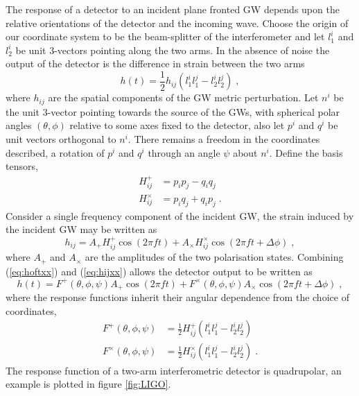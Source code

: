 The response of a detector to an incident plane fronted GW depends upon the relative orientations of the detector and the incoming wave. Choose the origin of our coordinate system to be the beam-splitter of the interferometer and let $l_{1}^{i}$ and $l_{2}^{i}$ be unit 3-vectors pointing along the two arms. In the absence of noise the output of the detector is the difference in strain between the two arms \citep{MTW}
\begin{equation}\label{eq:hoftxx} h(t)=\frac{1}{2}h_{ij}\left( l_{1}^{i}l_{1}^{j}-l_{2}^{i}l_{2}^{j} \right)\; , \end{equation}
where $h_{ij}$ are the spatial components of the GW metric perturbation. Let $n^{i}$ be the unit 3-vector pointing towards the source of the GWs, with spherical polar angles $(\theta,\phi)$ relative to some axes fixed to the detector, also let $p^{i}$ and $q^{i}$ be unit vectors orthogonal to $n^{i}$. There remains a freedom in the coordinates described, a rotation of $p^{i}$ and $q^{i}$ through an angle $\psi$ about $n^{i}$. Define the basis tensors,
\begin{eqnarray}
H^{+}_{ij}&=p_{i}p_{j}-q_{i}q_{j} \nonumber \\
H^{\times}_{ij}&=p_{i}q_{j}+q_{i}p_{j} \; .
\end{eqnarray}
Consider a single frequency component of the incident GW, the strain induced by the incident GW may be written as
\begin{equation}\label{eq:hijxx} h_{ij}=A_{+}H^{+}_{ij}\cos\left(2\pi ft\right)+A_{\times}H^{\times}_{ij}\cos\left(2\pi ft+\Delta \phi\right) \; ,\end{equation}
where $A_{+}$ and $A_{\times}$ are the amplitudes of the two polarisation states. Combining (\ref{eq:hoftxx}) and (\ref{eq:hijxx}) allows the detector output to be written as
\begin{equation} h(t)=F^{+}(\theta,\phi,\psi)A_{+}\cos\left(2\pi ft\right)+F^{\times}(\theta,\phi,\psi)A_{\times}\cos\left(2\pi f t + \Delta\phi \right)\; , \end{equation}
where the response functions inherit their angular dependence from the choice of coordinates,
\begin{eqnarray}\label{eq:responsefuncs}
F^{+}(\theta,\phi,\psi)&=\frac{1}{2}H^{+}_{ij}\left(l_{1}^{i}l_{1}^{j}-l_{2}^{i}l_{2}^{j}\right) \nonumber \\
F^{\times}(\theta,\phi,\psi)&=\frac{1}{2}H^{\times}_{ij}\left(l_{1}^{i}l_{1}^{j}-l_{2}^{i}l_{2}^{j}\right) \; . 
\end{eqnarray}
The response function of a two-arm interferometric detector is quadrupolar, an example is plotted in figure \ref{fig:LIGO}.

